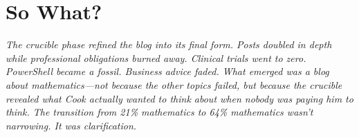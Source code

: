 \bigskip

\section*{So What?}

\textit{The crucible phase refined the blog into its final form. Posts doubled in depth while professional obligations burned away. Clinical trials went to zero. PowerShell became a fossil. Business advice faded. What emerged was a blog about mathematics---not because the other topics failed, but because the crucible revealed what Cook actually wanted to think about when nobody was paying him to think. The transition from 21\% mathematics to 64\% mathematics wasn't narrowing. It was clarification.}

